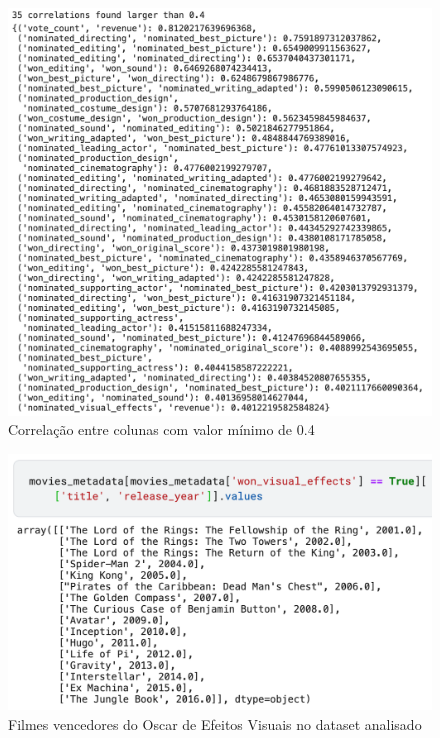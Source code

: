             \begin{figure}[htb]
            	\caption{\label{corrs0.4}Correlação entre colunas com valor mínimo de 0.4}
            	\begin{center}
            		\includegraphics[scale=0.7]{corrs0.4.png}
            	\end{center}
            \end{figure}

            \begin{figure}[htb]
            	\caption{\label{vencedores_efeitos}Filmes vencedores do Oscar de Efeitos Visuais no dataset analisado}
            	\begin{center}
            		\includegraphics[scale=0.7]{vencedores_efeitos.png}
            	\end{center}
            \end{figure}


